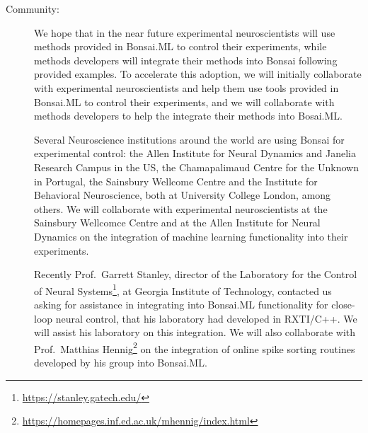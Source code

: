 \begin{description}
    \item[Community:] We hope that in the near future experimental neuroscientists
        will use methods provided in Bonsai.ML to control
        their experiments, while methods developers will integrate
        their methods into Bonsai following provided examples. To accelerate
        this adoption, we will initially collaborate with experimental neuroscientists
        and help them use tools provided in Bonsai.ML to control their
        experiments, and we will collaborate with methods developers to help
        the integrate their methods into Bosai.ML.

        Several Neuroscience institutions around the world are using Bonsai for
        experimental control: the Allen Institute for Neural Dynamics and
        Janelia Research Campus in the US, the Chamapalimaud Centre for the
        Unknown in Portugal, the Sainsbury Wellcome  Centre and the Institute
        for Behavioral Neuroscience, both at University College London, among
        others. We will collaborate with experimental neuroscientists at the
        Sainsbury Wellcomce Centre and at the Allen Institute for Neural
        Dynamics on the integration of machine learning functionality into
        their experiments.

        Recently Prof.~Garrett Stanley, director of the Laboratory for the
        Control of Neural
        Systems\footnote[11]{\url{https://stanley.gatech.edu/}}, at Georgia
        Institute of Technology, contacted us asking for assistance in
        integrating into Bonsai.ML functionality for close-loop neural control,
        that his laboratory had developed in RXTI/C++. We will assist his
        laboratory on this integration.
        We will also collaborate with Prof.~Matthias
        Hennig\footnote[12]{\url{https://homepages.inf.ed.ac.uk/mhennig/index.html}}
        on the integration of online spike sorting routines developed by his
        group into Bonsai.ML.

\end{description}

